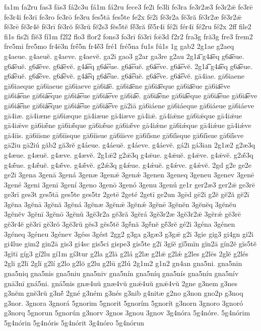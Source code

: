 {fa1m
fa2ru
fas3
fās3
fá2c3u
fá1m
fá2ru
fece3
fe2i
fe3li
fe3ra
fe3r2æ3
fe3r2ǣ
fe3rē
fe3r4i
fe3rī
fe3ro
fe3rō
fe3ru
fes5tā
fes5te
fe2x
fē2i
fĕ3r2a
fĕ3ră
fĕ3r2æ
fĕ3r2ǣ
fĕ3rē
fĕ3r4ĕ
fĕ3rī
fĕ3rŏ
fĕ3rŭ
fĕ2s3
fĕs5tĕ
fĕ́3ră
fĕ́5r4ī
fé2i
fér4ī
fé2ru
fé2x
2ff
file2
fi1s
fis2i
fĭĕ3
fí1m
f2l2
flo3
flor2
fons3
fo3rī
fŏ3rī
fœ̄3d
f2r2
fra3g
fră3g
fre3
frem2
fre5mi
fre5mo
fr4ē3n
frḗ5n
fr4ĕ́3
fré1
fré5na
fu1s
fú1s
1g
gab2
2g1ae
g2aeq
g4aeue.
g4aeuĕ.
g4aeve.
g4aevĕ.
ga2i
gao3
g2ar
ga3re
g2au
2g1a͞
g4a͞eq
g6a͞eue.
g6a͞euĕ.
g6a͞eve.
g6a͞evĕ.
g4á͞eq
g6á͞eue.
g6á͞euĕ.
g6á͞eve.
g6á͞evĕ.
2g1a͡
g4a͡eq
g6a͡eue.
g6a͡euĕ.
g6a͡eve.
g6a͡evĕ.
g4á͡eq
g6á͡eue.
g6á͡euĕ.
g6á͡eve.
g6á͡evĕ.
gā4iae.
gā6iaene
gā6iaeque
gā6iaeue
gā6iaeve
gā6ia͞e.
gā6ia͞ene
gā6ia͞eque
gā6ia͞eue
gā6ia͞eve
gā6iá͞ene
gā6iá͞eque
gā6iá͞eue
gā6iá͞eve
gā6ia͡e.
gā6ia͡ene
gā6ia͡eque
gā6ia͡eue
gā6ia͡eve
gā6iá͡ene
gā6iá͡eque
gā6iá͡eue
gā6iá͡eve
gā2iā
gā6iáene
gā6iáeque
gā6iáeue
gā6iáeve
gā4iæ.
gā4iæne
gā6iæque
gā4iæue
gā4iæve
gā4iǣ.
gā4iǣne
gā6iǣque
gā4iǣue
gā4iǣve
gā6iǣ́ne
gā6iǣ́que
gā6iǣ́ue
gā6iǣ́ve
gā4iǽne
gā6iǽque
gā4iǽue
gā4iǽve
gā4iīs.
gā6iīsne
gā6iīsque
gā6iīsue
gā6iīsve
gā6iī́sne
gā6iī́sque
gā6iī́sue
gā6iī́sve
gā2iu
gā2iú
găb2
gă3rĕ
g4áeue.
g4áeuĕ.
g4áeve.
g4áevĕ.
gá2i
gá3ian
2g1æ2
g2æ3q
g4æue.
g4æuĕ.
g4æve.
g4ævĕ.
2g1ǣ2
g2ǣ3q
g4ǣue.
g4ǣuĕ.
g4ǣve.
g4ǣvĕ.
g2ǣ́3q
g4ǣ́ue.
g4ǣ́uĕ.
g4ǣ́ve.
g4ǣ́vĕ.
g2ǽ3q
g4ǽue.
g4ǽuĕ.
g4ǽve.
g4ǽvĕ.
2gd
g2e
ge2e
ge2i
3gena
3genā
3gená
3genæ
3genǣ
3genǽ
3genen
3geneq
3geneu
3genev
3genē
3gené
3geni
3genī
3gení
3geno
3genō
3genó
3genu
3genú
ge1r
ger2æ3
ger2ǣ
ge3rē
ge3rī
ges3t
ges5tā
ges5te
ges5tr
2getē
2geté
2getī
ge2un
3gēd
gē2i
g2ĕ
gĕ2ă
gĕ2ī
3gĕna
3gĕnā
3gĕnă
3gĕná
3gĕnæ
3gĕnǣ
3gĕnǽ
3gĕnē
3gĕnĕn
3gĕnĕq
3gĕnĕu
3gĕnĕv
3gĕnī
3gĕnō
3gĕnŭ
3gĕ3r2a
gĕ3ră
3gĕrá
3gĕ3r2æ
3gĕ3r2ǣ
3gĕrǽ
gĕ3rē
gĕ3r4ĕ
gĕ3rī
gĕ3rŏ
3gĕ3rŭ
gĕs3
gĕs5tĕ
3gĕ́nă
3gĕ́nĕ
gĕ́3rĕ
gé2i
3géna
3génen
3géneq
3géneu
3génev
3géss
3gést
2gg2
g3ga
g3gæ3
g3gǣ
g2i
3gie
gig3
gi4gn
gi2i
gi4lue
gim2
gin2ā
gis3
gi4sc
gis5ci
gispe3
gis5te
g2ĭ
3gĭĕ
gĭ5mĭn
gĭn2ā
gĭn2ĕ
gĭs5tĕ
3gĭtī
gíg3
gí2lu
gí1m
gí3tur
g2la
g2lā
g2lá
g2læ
g2lǣ
g2lǽ
g2les
g2lēs
2glĕ
g2lés
2gli
g2lī
2glĭ
g2lí
g2lo
g2lŏ
g2lu
g2lū
g2lú
2g1m2
g1n2
gn4an
gna5ni.
gna5nin
gna5niq
gna5nis
gna5niu
gna5niv
gna5nín
gna5níq
gna5nís
gna5níu
gna5nív
gnā3nī
gná5ni.
gná5nis
gnæ4uŭ
gnæ4vŭ
gnǣ4uŭ
gnǣ4vŭ
2gne
g3nem
g3nes
g3nĕm
gnĕ3rŭ
g3nĕ́
2gné
g3ném
g3nés
g3nib
g4nitæ
g2no
g3non
gno2p
g3noq
g3nor.
3gnora
3gnorá
5gnorim
5gnorit
5gnorím
5gnorít
g3norn
3gnoro
3gnoró
g3norq
5gnorun
5gnorún
g3norv
3gnos
3gnou
3gnov
3g4nóra
5g4nóre.
5g4nórim
5g4nórin
5g4nóris
5g4nórit
3g4nóro
5g4nórun
}
